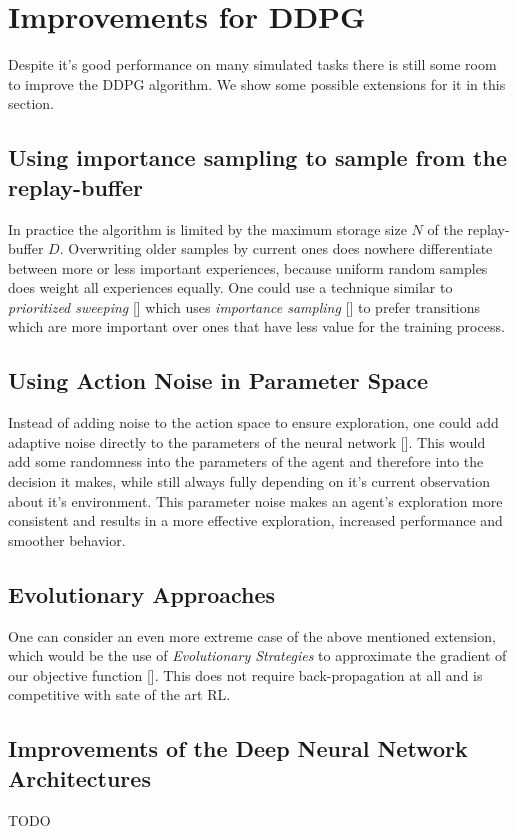 \section{Improvements for DDPG}
Despite it's good performance on many simulated tasks there is still some room to improve the DDPG algorithm. We show some possible extensions for it in this section.
\subsection{Using importance sampling to sample from the replay-buffer}
In practice the algorithm is limited by the maximum storage size $\mathit{N}$ of the replay-buffer $\mathit{D}$. Overwriting older samples by current ones does nowhere differentiate between more or less important experiences, because uniform random samples does weight all experiences equally. One could use a technique similar to \textit{prioritized sweeping} [\cite{moore1993prioritized}] which uses \textit{importance sampling} [\cite{glynn1989importance}] to prefer transitions which are more important over ones that have less value for the training process. 
\subsection{Using Action Noise in Parameter Space}
Instead of adding noise to the action space to ensure exploration, one could add adaptive noise directly to the parameters of the neural network [\cite{plappert2017parameter}]. This would add some randomness into the parameters of the agent and therefore into the decision it makes, while still always fully depending on it's current observation about it's environment. This parameter noise makes an agent's exploration more consistent and results in a more effective exploration, increased performance and smoother behavior. 
\subsection{Evolutionary Approaches}
One can consider an even more extreme case of the above mentioned extension, which would be the use of \textit{Evolutionary Strategies} to approximate the gradient of our objective function [\cite{salimans2017evolution}]. This does not require back-propagation at all and is competitive with sate of the art RL.
\subsection{Improvements of the Deep Neural Network Architectures}
TODO
\label{sec:1}

